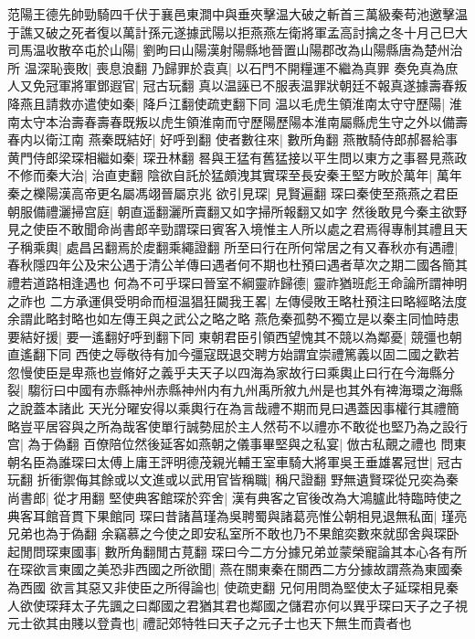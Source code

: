 范陽王德先帥勁騎四千伏于襄邑東澗中與垂夾擊温大破之斬首三萬級秦苟池邀擊温于譙又破之死者復以萬計孫元遂據武陽以拒燕燕左衛將軍孟高討擒之冬十月己巳大司馬温收散卒屯於山陽|{
	劉昫曰山陽漢射陽縣地晉置山陽郡改為山陽縣唐為楚州治所}
温深恥喪敗|{
	喪息浪翻}
乃歸罪於袁真|{
	以石門不開糧運不繼為真罪}
奏免真為庶人又免冠軍將軍鄧遐官|{
	冠古玩翻}
真以温誣已不服表温罪狀朝廷不報真遂據壽春叛降燕且請救亦遣使如秦|{
	降戶江翻使疏吏翻下同}
温以毛虎生領淮南太守守歷陽|{
	淮南太守本治壽春壽春既叛以虎生領淮南而守歷陽歷陽本淮南屬縣虎生守之外以備壽春内以衛江南}
燕秦既結好|{
	好呼到翻}
使者數往來|{
	數所角翻}
燕散騎侍郎郝晷給事黄門侍郎梁琛相繼如秦|{
	琛丑林翻}
晷與王猛有舊猛接以平生問以東方之事晷見燕政不修而秦大治|{
	治直吏翻}
陰欲自託於猛頗洩其實琛至長安秦王堅方畋於萬年|{
	萬年秦之櫟陽漢高帝更名屬馮翊晉屬京兆}
欲引見琛|{
	見賢遍翻}
琛曰秦使至燕燕之君臣朝服備禮灑掃宫庭|{
	朝直遥翻灑所賣翻又如字掃所報翻又如字}
然後敢見今秦主欲野見之使臣不敢聞命尚書郎辛勁謂琛曰賓客入境惟主人所以處之君焉得專制其禮且天子稱乘輿|{
	處昌呂翻焉於䖍翻乘繩證翻}
所至曰行在所何常居之有又春秋亦有遇禮|{
	春秋隱四年公及宋公遇于清公羊傳曰遇者何不期也杜預曰遇者草次之期二國各簡其禮若道路相逢遇也}
何為不可乎琛曰晉室不綱靈祚歸德|{
	靈祚猶班彪王命論所謂神明之祚也}
二方承運俱受明命而桓温猖狂闚我王畧|{
	左傳侵敗王略杜預注曰略經略法度余謂此略封略也如左傳王與之武公之略之略}
燕危秦孤勢不獨立是以秦主同恤時患要結好援|{
	要一遙翻好呼到翻下同}
東朝君臣引領西望愧其不競以為鄰憂|{
	競彊也朝直遙翻下同}
西使之辱敬待有加今彊寇既退交聘方始謂宜崇禮篤義以固二國之歡若忽慢使臣是卑燕也豈脩好之義乎夫天子以四海為家故行曰乘輿止曰行在今海縣分裂|{
	騶衍曰中國有赤縣神州赤縣神州内有九州禹所敘九州是也其外有禆海環之海縣之說蓋本諸此}
天光分曜安得以乘輿行在為言哉禮不期而見曰遇蓋因事權行其禮簡略豈平居容與之所為哉客使單行誠勢屈於主人然苟不以禮亦不敢從也堅乃為之設行宫|{
	為于偽翻}
百僚陪位然後延客如燕朝之儀事畢堅與之私宴|{
	倣古私覿之禮也}
問東朝名臣為誰琛曰太傅上庸王評明德茂親光輔王室車騎大將軍吳王垂雄畧冠世|{
	冠古玩翻}
折衝禦侮其餘或以文進或以武用官皆稱職|{
	稱尺證翻}
野無遺賢琛從兄奕為秦尚書郎|{
	從才用翻}
堅使典客館琛於弈舍|{
	漢有典客之官後改為大鴻臚此特臨時使之典客耳館音貫下果館同}
琛曰昔諸菖瑾為吳聘蜀與諸葛亮惟公朝相見退無私面|{
	瑾亮兄弟也為于偽翻}
余竊慕之今使之即安私室所不敢也乃不果館奕數來就邸舍與琛卧起閒問琛東國事|{
	數所角翻閒古莧翻}
琛曰今二方分據兄弟並蒙榮寵論其本心各有所在琛欲言東國之美恐非西國之所欲聞|{
	燕在關東秦在關西二方分據故謂燕為東國秦為西國}
欲言其惡又非使臣之所得論也|{
	使疏吏翻}
兄何用問為堅使太子延琛相見秦人欲使琛拜太子先諷之曰鄰國之君猶其君也鄰國之儲君亦何以異乎琛曰天子之子視元士欲其由賤以登貴也|{
	禮記郊特牲曰天子之元子士也天下無生而貴者也}
